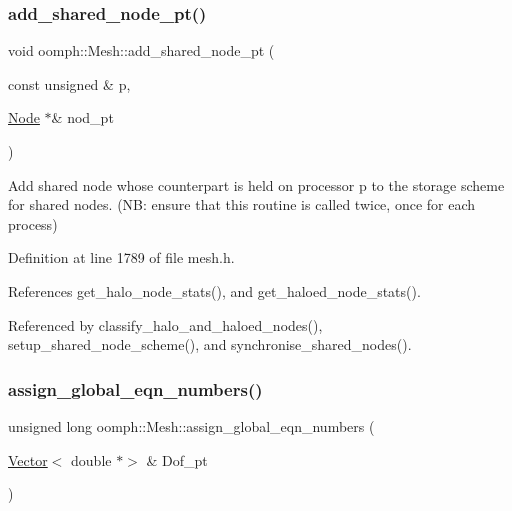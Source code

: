 \subsubsection{\texorpdfstring{add\+\_\+shared\+\_\+node\+\_\+pt()}{add\_shared\_node\_pt()}}
{\footnotesize\ttfamily void oomph\+::\+Mesh\+::add\+\_\+shared\+\_\+node\+\_\+pt (\begin{DoxyParamCaption}\item[{const unsigned \&}]{p,  }\item[{\hyperlink{classoomph_1_1Node}{Node} $\ast$\&}]{nod\+\_\+pt }\end{DoxyParamCaption})\hspace{0.3cm}{\ttfamily [inline]}}



Add shared node whose counterpart is held on processor p to the storage scheme for shared nodes. (NB\+: ensure that this routine is called twice, once for each process) 



Definition at line 1789 of file mesh.\+h.



References get\+\_\+halo\+\_\+node\+\_\+stats(), and get\+\_\+haloed\+\_\+node\+\_\+stats().



Referenced by classify\+\_\+halo\+\_\+and\+\_\+haloed\+\_\+nodes(), setup\+\_\+shared\+\_\+node\+\_\+scheme(), and synchronise\+\_\+shared\+\_\+nodes().

\mbox{\label{classoomph_1_1Mesh_a6c24ccddd928dba0476443f7a74c9d6f}} 
\subsubsection{\texorpdfstring{assign\+\_\+global\+\_\+eqn\+\_\+numbers()}{assign\_global\_eqn\_numbers()}}
{\footnotesize\ttfamily unsigned long oomph\+::\+Mesh\+::assign\+\_\+global\+\_\+eqn\+\_\+numbers (\begin{DoxyParamCaption}\item[{\hyperlink{classoomph_1_1Vector}{Vector}$<$ double $\ast$$>$ \&}]{Dof\+\_\+pt }\end{DoxyParamCaption})\hspace{0.3cm}{\ttfamily [protected]}}




